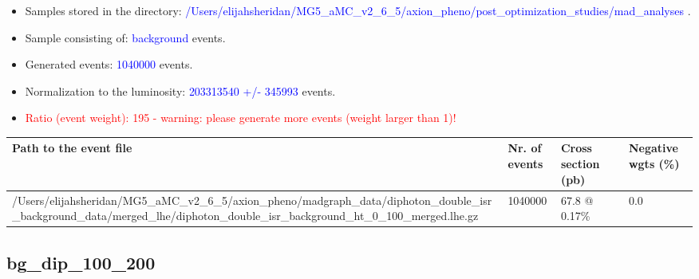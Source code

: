 \documentclass[a4paper, 10pt]{article}
\begin{document}
\begin{itemize}
  \item Samples stored in the directory: \textcolor{blue}{/\-Users/\-elijahsheridan/\-MG5\_aMC\_v2\_6\_5/\-axion\_pheno/\-post\_optimization\_studies/\-mad\_analyses} .
   \item Sample consisting of: \textcolor{blue}{background}  events.
   \item Generated events: \textcolor{blue}{1040000 }  events.
   \item Normalization to the luminosity: \textcolor{blue}{203313540}\textcolor{blue}{ +/\-- }\textcolor{blue}{345993 }  events.
   \item\textcolor{red}{Ratio (event weight): }\textcolor{red}{195 }\textcolor{red}{ - warning: please generate more events (weight larger than 1)!}
\textcolor{red}{}
\end{itemize}
\begin{table}[H]
  \begin{center}
    \begin{tabular}{|m{55.0mm}|m{25.0mm}|m{30.0mm}|m{30.0mm}|}
      \hline
      {\cellcolor{yellow}         Path to the event file}& {\cellcolor{yellow}         Nr. of events}& {\cellcolor{yellow}         Cross section (pb)}& {\cellcolor{yellow}         Negative wgts (\%)}\\
      \hline
      {\cellcolor{white}          /\-Users/\-elijahsheridan/\-MG5\_aMC\_v2\_6\_5/\-axion\_pheno/\-madgraph\_data/\-diphoton\_double\_isr\_background\_data/\-merged\_lhe/\-diphoton\_double\_isr\_background\_ht\_0\_100\_merged.lhe.gz}& {\cellcolor{white}          1040000}& {\cellcolor{white}          67.8 @ 0.17\%}& {\cellcolor{white}          0.0}\\
\hline
    \end{tabular}
  \end{center}
\end{table}

\subsection{ bg\_dip\_100\_200}
\end{document}
